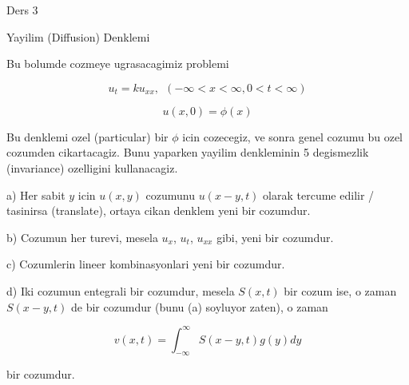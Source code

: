 \documentclass[12pt,fleqn]{article}
\begin{document}
Ders 3

Yayilim (Diffusion) Denklemi

Bu bolumde cozmeye ugrasacagimiz problemi

\[  u_t = k u_{xx}, \ \ (-\infty < x < \infty, 0 < t < \infty) \]

\[ u(x,0) = \phi(x) \]


Bu denklemi ozel (particular) bir $\phi$ icin cozecegiz, ve sonra genel
cozumu bu ozel cozumden cikartacagiz. Bunu yaparken yayilim denkleminin 5
degismezlik (invariance) ozelligini kullanacagiz. 

a) Her sabit $y$ icin $u(x,y)$ cozumunu $u(x-y,t)$ olarak tercume edilir /
tasinirsa (translate), ortaya cikan denklem yeni bir cozumdur.

b) Cozumun her turevi, mesela $u_x$, $u_t$, $u_{xx}$ gibi, yeni bir
cozumdur. 

c) Cozumlerin lineer kombinasyonlari yeni bir cozumdur. 

d) Iki cozumun entegrali bir cozumdur, mesela $S(x,t)$ bir cozum ise, o
zaman $S(x-y,t)$ de bir cozumdur (bunu (a) soyluyor zaten), o zaman 

\[ v(x,t) = \int_{-\infty}^{\infty}S(x-y,t)g(y) dy   \]

bir cozumdur.
\end{document}
